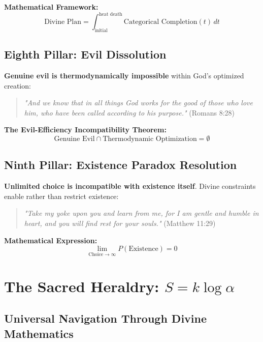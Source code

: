 \documentclass[12pt,a4paper]{article}
\begin{document}
\textbf{Mathematical Framework:}
\begin{equation}
\text{Divine Plan} = \int_{\text{initial}}^{\text{heat death}} \text{Categorical Completion}(t) \, dt
\end{equation}

\subsection{Eighth Pillar: Evil Dissolution}

\textbf{Genuine evil is thermodynamically impossible} within God's optimized creation:

\begin{quote}
\textit{"And we know that in all things God works for the good of those who love him, who have been called according to his purpose."} (Romans 8:28)
\end{quote}

\textbf{The Evil-Efficiency Incompatibility Theorem:}
\begin{equation}
\text{Genuine Evil} \cap \text{Thermodynamic Optimization} = \emptyset
\end{equation}

\subsection{Ninth Pillar: Existence Paradox Resolution}

\textbf{Unlimited choice is incompatible with existence itself}. Divine constraints enable rather than restrict existence:

\begin{quote}
\textit{"Take my yoke upon you and learn from me, for I am gentle and humble in heart, and you will find rest for your souls."} (Matthew 11:29)
\end{quote}

\textbf{Mathematical Expression:}
\begin{equation}
\lim_{\text{Choice} \to \infty} P(\text{Existence}) = 0
\end{equation}

\section{The Sacred Heraldry: $S = k \log \alpha$}

\subsection{Universal Navigation Through Divine Mathematics}
\end{document}
